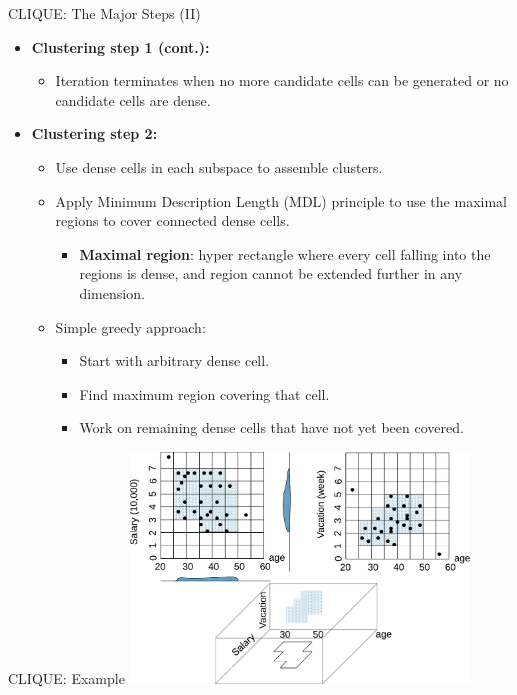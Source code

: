 \begin{frame}{CLIQUE: The Major Steps (II)}
	\begin{itemize}
		\item \textbf{Clustering step 1 (cont.):}
		\begin{itemize}
			\item Iteration terminates when no more candidate cells can be 
			generated or no candidate cells are dense.
		\end{itemize}
		\item \textbf{Clustering step 2:}
		\begin{itemize}
			\item Use dense cells in each subspace to assemble clusters.
			\item Apply Minimum Description Length (MDL) principle to use the 
			maximal regions to cover connected dense cells.
			\begin{itemize}
				\item \textbf{\color{airforceblue}Maximal region}: hyper 
				rectangle where every cell falling into the regions is dense, 
				and region cannot be extended further in any dimension.
			\end{itemize}
			\item Simple greedy approach:
			\begin{itemize}
				\item Start with arbitrary dense cell.
				\item Find maximum region covering that cell.
				\item Work on remaining dense cells that have not yet been 
				covered.
			\end{itemize}
		\end{itemize}
	\end{itemize}
\end{frame}

\begin{frame}{CLIQUE: Example}
	\centering
	\includegraphics[width=9cm]{img/clique.pdf}
\end{frame}

